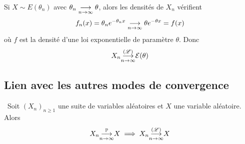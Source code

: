 \begin{example}
    Si \(X\sim E(\theta_n)\) avec \(\theta_n\underset{n\to\infty}{\longrightarrow} \theta\), alors 
    les densités de \(X_n\) vérifient
    \begin{equation*}
        f_n(x) = \theta_n e^{-\theta_n x} \underset{n\to\infty}{\longrightarrow} \theta e^{-\theta x} = f(x)
    \end{equation*}
    où \(f\) est la densité d'une loi exponentielle de paramètre \(\theta\).
    Donc
    \begin{equation*}
        X_n \underset{n\to\infty}{{\overset{(\mathscr{L})}{\longrightarrow}}} \mathcal E(\theta)
    \end{equation*}
\end{example}

\subsection{Lien avec les autres modes de convergence}

\begin{proposition}\,
    Soit \({(X_n)}_{n\geq 1}\) une suite de variables aléatoires
    et \(X\) une variable aléatoire. Alors
    \begin{equation*}
        X_n\underset{n\to\infty}{{\overset{\mathbb{P}}{\longrightarrow}}} X \implies X_n\underset{n\to\infty}{{\overset{(\mathscr{L})}{\longrightarrow}}} X
    \end{equation*}
\end{proposition}

